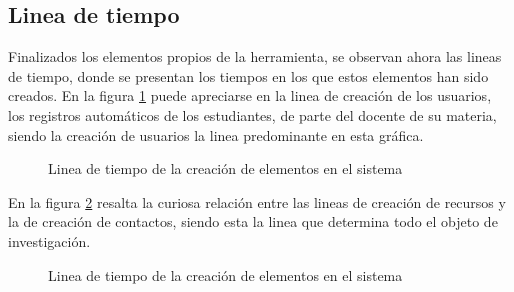 \subsection{Linea de tiempo}
Finalizados los elementos propios de la herramienta, se observan ahora las
lineas de tiempo, donde se presentan los tiempos en los que estos elementos han
sido creados.
En la figura \ref{tiempos_area_1} puede apreciarse en la linea de creación de
los usuarios, los registros automáticos de los estudiantes, de parte del
docente de su materia, siendo la creación de usuarios la linea predominante en
esta gráfica.

\begin{figure}
\centering

\caption{Linea de tiempo de la creación de elementos en el sistema}
\label{tiempos_area_1}
\end{figure}

En la figura \ref{tiempos_area_2} resalta la curiosa relación entre las lineas
de creación de recursos y la de creación de contactos, siendo esta la linea que
determina todo el objeto de investigación.

\begin{figure}
\centering

\caption{Linea de tiempo de la creación de elementos en el sistema}
\label{tiempos_area_2}
\end{figure}


